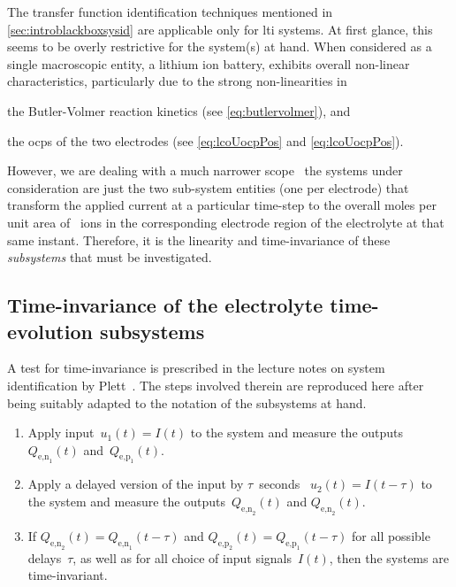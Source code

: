 The      transfer     function      identification     techniques      mentioned
in \cref{sec:introblackboxsysid} are  applicable only for \gls{lti}  systems. At
first glance,  this seems to  be overly restrictive  for the system(s)  at hand.
When  considered  as  a  single  macroscopic  entity,  a  lithium  ion  battery,
exhibits  overall non-linear  characteristics,  particularly due  to the  strong
non-linearities in
\begin{enumerate*}[label=\emph{\alph*})]
    \item the Butler-Volmer reaction kinetics (see \cref{eq:butlervolmer}), and
    \item the \glspl{ocp} of the two electrodes (see \cref{eq:lcoUocpPos} and \cref{eq:lcoUocpPos}).
\end{enumerate*}
However,  we are  dealing with  a much  narrower scope  \ie~the  systems under
consideration  are just  the two  sub-system entities  (one per  electrode) that
transform the  applied current at  a particular  time-step to the  overall moles
per  unit area  of  ~ions in  the  corresponding  electrode region  of
the  electrolyte at  that  same  instant. Therefore,  it  is  the linearity  and
time-invariance of these \emph{subsystems} that must be investigated.

\subsection{Time-invariance of the electrolyte time-evolution subsystems}\label{subsec:timeinvariance}
A  test  for time-invariance  is  prescribed  in  the  lecture notes  on  system
identification by  Plett~\cite{PlettECE5560_02}. The steps involved  therein are
reproduced here after  being suitably adapted to the notation  of the subsystems
at hand.
\begin{enumerate}
    \item Apply input~${u_1(t) = I(t)}$ to the system and measure the outputs~$Q_{\text{e,n}_1}\!(t)$ and~$Q_{\text{e,p}_1}\!(t)$.
    \item Apply a delayed version of the input by $\tau$~seconds \ie~${u_2(t) = I(t-\tau)}$ to the system and measure the outputs~$Q_{\text{e,n}_2}\!(t)$ and $Q_{\text{e,n}_2}\!(t)$.
    \item If ${Q_{\text{e,n}_2}\!(t) = Q_{\text{e,n}_1}\!(t-\tau)}$ and
        ${Q_{\text{e,p}_2}\!(t) = Q_{\text{e,p}_1}\!(t-\tau)}$ for all possible
        delays~$\tau$, as well as for all choice of input signals~$I(t)$, then the systems are time-invariant.
\end{enumerate}

